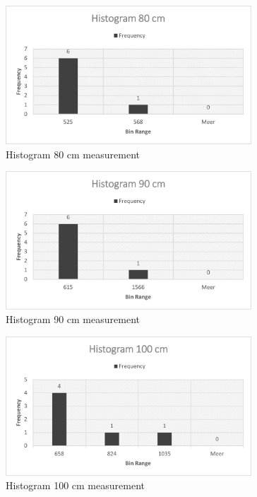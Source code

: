 \documentclass[10pt,a4paper]{article}
\begin{document}
\begin{figure}[H]
   \centering
   \includegraphics[width=0.82\textwidth]{histogram80.pdf}
   \caption{Histogram 80 cm measurement}
   \label{fig:histrogram80}
\end{figure}

\begin{figure}[H]
   \centering
   \includegraphics[width=0.82\textwidth]{histogram90.pdf}
   \caption{Histogram 90 cm measurement}
   \label{fig:histrogram90}
\end{figure}

\begin{figure}[H]
   \centering
   \includegraphics[width=0.82\textwidth]{histogram100.pdf}
   \caption{Histogram 100 cm measurement}
   \label{fig:histrogram100}
\end{figure}
\end{document}
